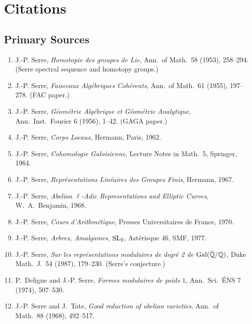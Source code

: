 \section{Citations}\subsection*{Primary Sources}
\begin{enumerate}
    \item J.-P. Serre, \textit{Homotopie des groupes de Lie}, Ann.\ of Math.\ 58 (1953), 258--294. (Serre spectral sequence and homotopy groups.)
    \item J.-P. Serre, \textit{Faisceaux Alg\'ebriques Coh\'erents}, Ann.\ of Math.\ 61 (1955), 197--278. (FAC paper.)
    \item J.-P. Serre, \textit{G\'eom\'etrie Alg\'ebrique et G\'eom\'etrie Analytique}, Ann.\ Inst.\ Fourier 6 (1956), 1--42. (GAGA paper.)
    \item J.-P. Serre, \textit{Corps Locaux}, Hermann, Paris, 1962.
    \item J.-P. Serre, \textit{Cohomologie Galoisienne}, Lecture Notes in Math.\ 5, Springer, 1964.
    \item J.-P. Serre, \textit{Repr\'esentations Lin\'eaires des Groupes Finis}, Hermann, 1967.
    \item J.-P. Serre, \textit{Abelian \(\ell\)-Adic Representations and Elliptic Curves}, W.\ A.\ Benjamin, 1968.
    \item J.-P. Serre, \textit{Cours d'Arithm\'etique}, Presses Universitaires de France, 1970.
    \item J.-P. Serre, \textit{Arbres, Amalgames, \(\operatorname{SL}_2\)}, Ast\'erisque 46, SMF, 1977.
    \item J.-P. Serre, \textit{Sur les repr\'esentations modulaires de degr\'e 2 de \(\operatorname{Gal}(\bar{\mathbb{Q}}/\mathbb{Q})\)}, Duke Math.\ J.\ 54 (1987), 179--230. (Serre's conjecture.)
    \item P.\ Deligne and J.-P. Serre, \textit{Formes modulaires de poids \(1\)}, Ann.\ Sci.\ \'ENS 7 (1974), 507--530.
    \item J.-P. Serre and J.\ Tate, \textit{Good reduction of abelian varieties}, Ann.\ of Math.\ 88 (1968), 492--517.
\end{enumerate}

